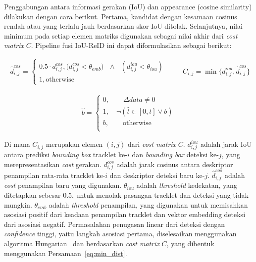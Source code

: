 Penggabungan antara informasi gerakan (IoU) dan appearance (cosine similarity) dilakukan dengan cara berikut. Pertama, kandidat dengan kesamaan cosinus rendah atau yang terlalu jauh berdasarkan skor IoU ditolak. Selanjutnya, nilai minimum pada setiap elemen matriks digunakan sebagai nilai akhir dari \emph{cost matrix} $C$. Pipeline fusi IoU-ReID ini dapat diformulasikan sebagai berikut:

\begin{equation}
    \begin{aligned}
    \hat{d}_{i, j}^{cos} = 
        \begin{cases}
                0.5 \cdot d_{i, j}^{cos}, \text{($d_{i, j}^{cos} < \theta_{emb})$ $\land$ $(d_{i, j}^{iou} < \theta_{iou})$}\\
            1, \text{otherwise}
        \end{cases}
    \end{aligned}
    \quad\quad C_{i, j} = \min\{d_{i, j}^{iou}, \hat{d}_{i, j}^{cos}\}    
    \label{eq:min_dist}        
\end{equation}

\begin{equation}
  \begin{aligned}
  \hat{b} = 
      \begin{cases}
          0, \quad\quad \Delta data \neq 0 \\
          1, \quad \neg ( \hat{t} \in [0, t] \lor b ) \\
          b, \quad\quad \text{otherwise}\\
      \end{cases}
  \end{aligned}       
\end{equation}

Di mana $C_{i, j}$ merupakan elemen $(i, j)$ dari \emph{cost matrix} $C$. $d_{i, j}^{iou}$ adalah jarak IoU antara prediksi \emph{bounding box} tracklet ke-$i$ dan \emph{bounding box} deteksi ke-$j$, yang merepresentasikan \emph{cost} gerakan. $d_{i, j}^{cos}$ adalah jarak cosinus antara deskriptor penampilan rata-rata tracklet ke-$i$ dan deskriptor deteksi baru ke-$j$. $\hat{d}_{i, j}^{cos}$ adalah \emph{cost} penampilan baru yang digunakan. $\theta_{iou}$ adalah \emph{threshold} kedekatan, yang ditetapkan sebesar 0.5, untuk menolak pasangan tracklet dan deteksi yang tidak mungkin. $\theta_{emb}$ adalah \emph{threshold} penampilan, yang digunakan untuk memisahkan asosiasi positif dari keadaan penampilan tracklet dan vektor embedding deteksi dari asosiasi negatif.
Permasalahan penugasan linear dari deteksi dengan \emph{confidence} tinggi, yaitu langkah asosiasi pertama, diselesaikan menggunakan algoritma Hungarian~\cite{kuhn1955hungarian} dan berdasarkan \emph{cost matrix} $C$, yang dibentuk menggunakan Persamaan~\ref{eq:min_dist}.

